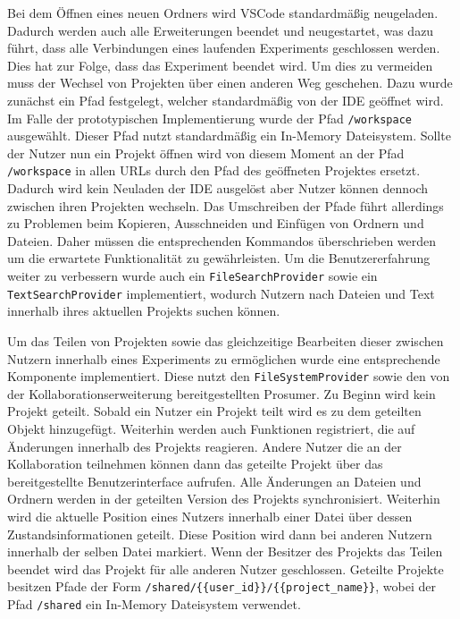 Bei dem Öffnen eines neuen Ordners wird VSCode standardmäßig neugeladen. Dadurch werden auch alle Erweiterungen beendet und neugestartet, was dazu führt, dass alle Verbindungen eines laufenden Experiments geschlossen werden. Dies hat zur Folge, dass das Experiment beendet wird. Um dies zu vermeiden muss der Wechsel von Projekten über einen anderen Weg geschehen. Dazu wurde zunächst ein Pfad festgelegt, welcher standardmäßig von der IDE geöffnet wird. Im Falle der prototypischen Implementierung wurde der Pfad \texttt{/workspace} ausgewählt. Dieser Pfad nutzt standardmäßig ein In-Memory Dateisystem. Sollte der Nutzer nun ein Projekt öffnen wird von diesem Moment an der Pfad \texttt{/workspace} in allen URLs durch den Pfad des geöffneten Projektes ersetzt. Dadurch wird kein Neuladen der IDE ausgelöst aber Nutzer können dennoch zwischen ihren Projekten wechseln. Das Umschreiben der Pfade führt allerdings zu Problemen beim Kopieren, Ausschneiden und Einfügen von Ordnern und Dateien. Daher müssen die entsprechenden Kommandos überschrieben werden um die erwartete Funktionalität zu gewährleisten. Um die Benutzererfahrung weiter zu verbessern wurde auch ein \texttt{FileSearchProvider} sowie ein \texttt{TextSearchProvider} implementiert, wodurch Nutzern nach Dateien und Text innerhalb ihres aktuellen Projekts suchen können.

Um das Teilen von Projekten sowie das gleichzeitige Bearbeiten dieser zwischen Nutzern innerhalb eines Experiments zu ermöglichen wurde eine entsprechende Komponente implementiert. Diese nutzt den \texttt{FileSystemProvider} sowie den von der Kollaborationserweiterung bereitgestellten Prosumer. Zu Beginn wird kein Projekt geteilt. Sobald ein Nutzer ein Projekt teilt wird es zu dem geteilten Objekt hinzugefügt. Weiterhin werden auch Funktionen registriert, die auf Änderungen innerhalb des Projekts reagieren. Andere Nutzer die an der Kollaboration teilnehmen können dann das geteilte Projekt über das bereitgestellte Benutzerinterface aufrufen. Alle Änderungen an Dateien und Ordnern werden in der geteilten Version des Projekts synchronisiert. Weiterhin wird die aktuelle Position eines Nutzers innerhalb einer Datei über dessen Zustandsinformationen geteilt. Diese Position wird dann bei anderen Nutzern innerhalb der selben Datei markiert. Wenn der Besitzer des Projekts das Teilen beendet wird das Projekt für alle anderen Nutzer geschlossen. Geteilte Projekte besitzen Pfade der Form \texttt{/shared/\{\{user\_id\}\}/\{\{project\_name\}\}}, wobei der Pfad \texttt{/shared} ein In-Memory Dateisystem verwendet.